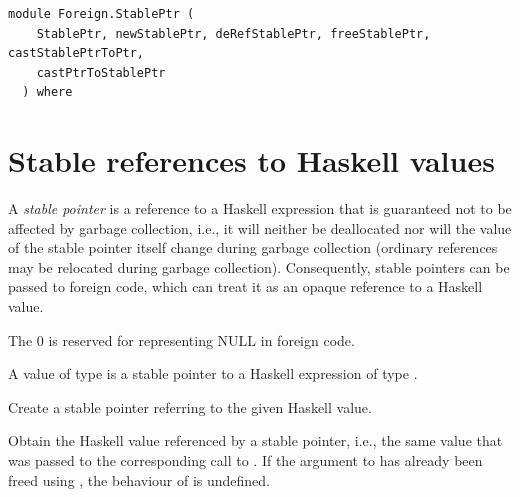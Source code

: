 \label{module:Foreign.StablePtr}
\haddockbeginheader
{\haddockverb\begin{verbatim}
module Foreign.StablePtr (
    StablePtr, newStablePtr, deRefStablePtr, freeStablePtr, castStablePtrToPtr,
    castPtrToStablePtr
  ) where\end{verbatim}}
\haddockendheader

\section{Stable references to Haskell values}
\begin{haddockdesc}
\item[\begin{tabular}{@{}l}
data StablePtr a
\end{tabular}]
{\haddockbegindoc
A \emph{stable pointer} is a reference to a Haskell expression that is
guaranteed not to be affected by garbage collection, i.e., it will neither be
deallocated nor will the value of the stable pointer itself change during
garbage collection (ordinary references may be relocated during garbage
collection).  Consequently, stable pointers can be passed to foreign code,
which can treat it as an opaque reference to a Haskell value.\par
The  0 is reserved for representing NULL in foreign code.\par
A value of type  is a stable pointer to a Haskell
expression of type .\par}
\end{haddockdesc}
\begin{haddockdesc}
\item[\begin{tabular}{@{}l}
instance Storable StablePtr a\\instance Eq StablePtr a\\\end{tabular}]
\end{haddockdesc}
\begin{haddockdesc}
\item[\begin{tabular}{@{}l}
newStablePtr :: a -> IO (StablePtr a)
\end{tabular}]
{\haddockbegindoc
Create a stable pointer referring to the given Haskell value.\par}
\end{haddockdesc}
\begin{haddockdesc}
\item[\begin{tabular}{@{}l}
deRefStablePtr :: StablePtr a -> IO a
\end{tabular}]
{\haddockbegindoc
Obtain the Haskell value referenced by a stable pointer, i.e., the
 same value that was passed to the corresponding call to
 .  If the argument to  has
 already been freed using , the behaviour of
  is undefined.\par}
\end{haddockdesc}
